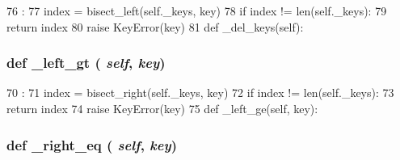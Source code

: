 \begin{DoxyCode}
76                            :
77         index = bisect_left(self._keys, key)
78         if index != len(self._keys):
79             return index
80         raise KeyError(key)
81 
    def _del_keys(self):
\end{DoxyCode}
\hypertarget{classm5_1_1util_1_1sorteddict_1_1SortedDict_a010098bbcf9a823de34651f46ec2f04a}{
\subsubsection[{\_\-left\_\-gt}]{\setlength{\rightskip}{0pt plus 5cm}def \_\-left\_\-gt ( {\em self}, \/   {\em key})}}
\label{classm5_1_1util_1_1sorteddict_1_1SortedDict_a010098bbcf9a823de34651f46ec2f04a}



\begin{DoxyCode}
70                            :
71         index = bisect_right(self._keys, key)
72         if index != len(self._keys):
73             return index
74         raise KeyError(key)
75 
    def _left_ge(self, key):
\end{DoxyCode}
\hypertarget{classm5_1_1util_1_1sorteddict_1_1SortedDict_ad7b913bb0777a4cc32f40f4ef56065b7}{
\subsubsection[{\_\-right\_\-eq}]{\setlength{\rightskip}{0pt plus 5cm}def \_\-right\_\-eq ( {\em self}, \/   {\em key})}}
\label{classm5_1_1util_1_1sorteddict_1_1SortedDict_ad7b913bb0777a4cc32f40f4ef56065b7}



